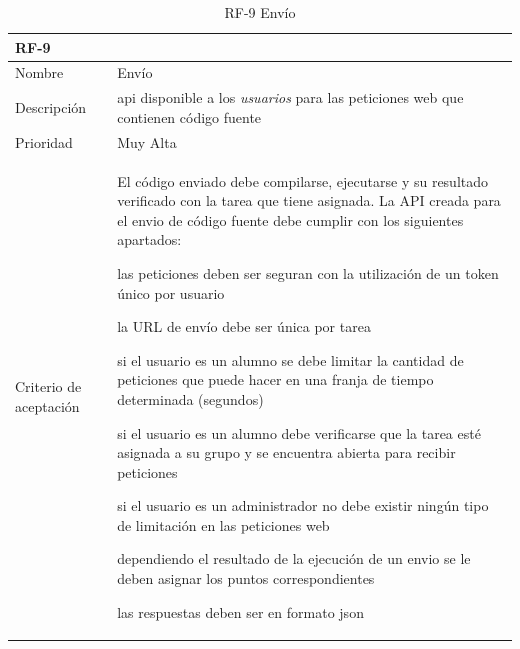 \documentclass[11pt,spanish,listoffigures,listoftables]{tfgetsinf}
\begin{document}
\begin{table}[ht!]
	\centering
	\begin{tabular}{ |p{4cm}||p{10cm}|  }
		\multicolumn{2}{l}{\textbf{RF-9}} \\
		\hline
		Nombre   & Envío \\
		\hline
		Descripción  & \acrshort{api} disponible a los \textit{usuarios} para las peticiones web que contienen código fuente  \\
		\hline
		Prioridad &  Muy Alta\\
		\hline
		Criterio de aceptación & El código enviado debe compilarse, ejecutarse y su resultado verificado con la \gls{tarea} que tiene asignada.
		La API creada para el \gls{envio} de código fuente debe cumplir con los siguientes apartados: \newline
		\begin{tabitem}
			\item las peticiones deben ser seguran con la utilización de un token único por usuario
			\item la URL de envío debe ser única por \gls{tarea}
			\item si el usuario es un \gls{alumno} se debe limitar la cantidad de peticiones que puede hacer en una franja de tiempo determinada (segundos)
			\item si el usuario es un \gls{alumno} debe verificarse que la \gls{tarea} esté asignada a su \gls{grupo} y se encuentra abierta para recibir peticiones
			\item si el usuario es un \gls{administrador} no debe existir ningún tipo de limitación en las peticiones web
			\item dependiendo el resultado de la ejecución de un \gls{envio} se le deben asignar los puntos correspondientes
			\item las respuestas deben ser en formato \acrshort{json}
		\end{tabitem} \\
		\hline
	\end{tabular}
	\caption{RF-9 Envío}
	\label{table:9}
\end{table}
\end{document}
